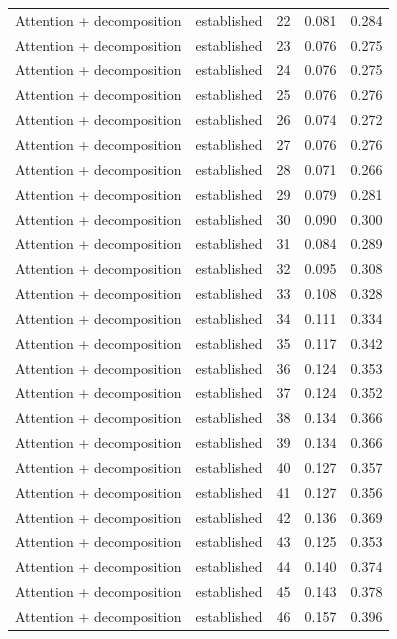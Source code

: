\begin{tabular}{llrrr}
Attention + decomposition & established & 22 & 0.081 & 0.284 \\
Attention + decomposition & established & 23 & 0.076 & 0.275 \\
Attention + decomposition & established & 24 & 0.076 & 0.275 \\
Attention + decomposition & established & 25 & 0.076 & 0.276 \\
Attention + decomposition & established & 26 & 0.074 & 0.272 \\
Attention + decomposition & established & 27 & 0.076 & 0.276 \\
Attention + decomposition & established & 28 & 0.071 & 0.266 \\
Attention + decomposition & established & 29 & 0.079 & 0.281 \\
Attention + decomposition & established & 30 & 0.090 & 0.300 \\
Attention + decomposition & established & 31 & 0.084 & 0.289 \\
Attention + decomposition & established & 32 & 0.095 & 0.308 \\
Attention + decomposition & established & 33 & 0.108 & 0.328 \\
Attention + decomposition & established & 34 & 0.111 & 0.334 \\
Attention + decomposition & established & 35 & 0.117 & 0.342 \\
Attention + decomposition & established & 36 & 0.124 & 0.353 \\
Attention + decomposition & established & 37 & 0.124 & 0.352 \\
Attention + decomposition & established & 38 & 0.134 & 0.366 \\
Attention + decomposition & established & 39 & 0.134 & 0.366 \\
Attention + decomposition & established & 40 & 0.127 & 0.357 \\
Attention + decomposition & established & 41 & 0.127 & 0.356 \\
Attention + decomposition & established & 42 & 0.136 & 0.369 \\
Attention + decomposition & established & 43 & 0.125 & 0.353 \\
Attention + decomposition & established & 44 & 0.140 & 0.374 \\
Attention + decomposition & established & 45 & 0.143 & 0.378 \\
Attention + decomposition & established & 46 & 0.157 & 0.396 \\

\end{tabular}
